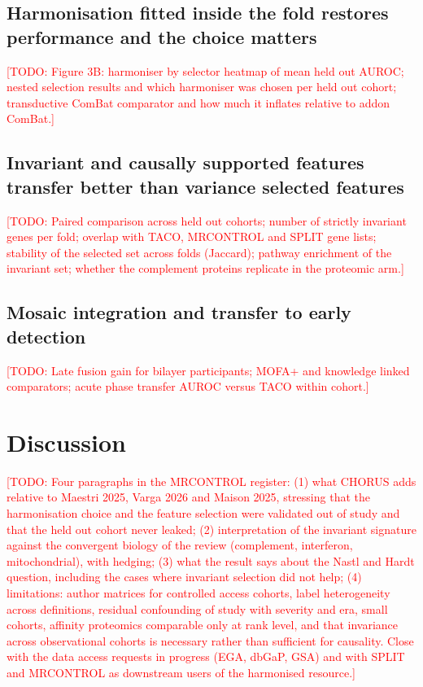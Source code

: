 \documentclass[unnumsec,webpdf,contemporary,large]{oup-authoring-template}
\newcommand{\todo}[1]{\textcolor{red}{[TODO: #1]}}
\begin{document}
\subsection{Harmonisation fitted inside the fold restores performance and the choice matters}

\todo{Figure 3B: harmoniser by selector heatmap of mean held out AUROC; nested selection results and which harmoniser was chosen per held out cohort; transductive ComBat comparator and how much it inflates relative to addon ComBat.}

\subsection{Invariant and causally supported features transfer better than variance selected features}

\todo{Paired comparison across held out cohorts; number of strictly invariant genes per fold; overlap with TACO, MRCONTROL and SPLIT gene lists; stability of the selected set across folds (Jaccard); pathway enrichment of the invariant set; whether the complement proteins replicate in the proteomic arm.}

\subsection{Mosaic integration and transfer to early detection}

\todo{Late fusion gain for bilayer participants; MOFA+ and knowledge linked comparators; acute phase transfer AUROC versus TACO within cohort.}

\section{Discussion}

\todo{Four paragraphs in the MRCONTROL register: (1) what CHORUS adds relative to Maestri 2025, Varga 2026 and Maison 2025, stressing that the harmonisation choice and the feature selection were validated out of study and that the held out cohort never leaked; (2) interpretation of the invariant signature against the convergent biology of the review (complement, interferon, mitochondrial), with hedging; (3) what the result says about the Nastl and Hardt question, including the cases where invariant selection did not help; (4) limitations: author matrices for controlled access cohorts, label heterogeneity across definitions, residual confounding of study with severity and era, small cohorts, affinity proteomics comparable only at rank level, and that invariance across observational cohorts is necessary rather than sufficient for causality. Close with the data access requests in progress (EGA, dbGaP, GSA) and with SPLIT and MRCONTROL as downstream users of the harmonised resource.}
\end{document}
